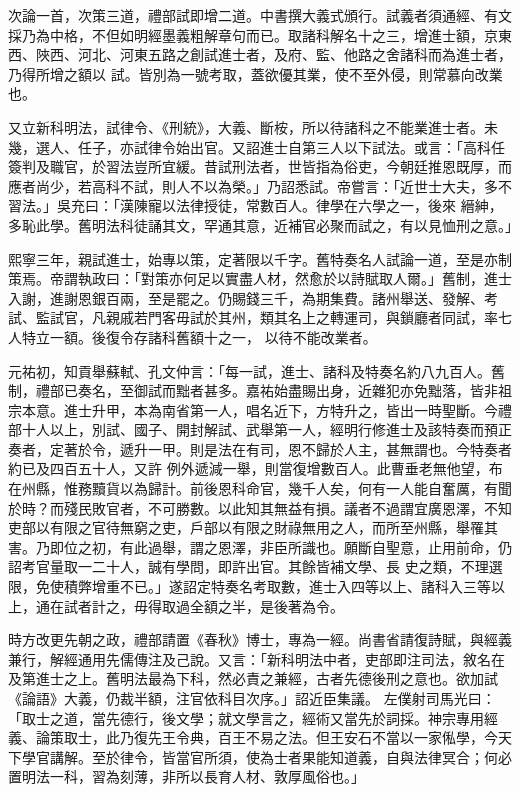 \begin{pinyinscope}
 次論一首，次策三道，禮部試即增二道。中書撰大義式頒行。試義者須通經、有文採乃為中格，不但如明經墨義粗解章句而已。取諸科解名十之三，增進士額，京東西、陜西、河北、河東五路之創試進士者，及府、監、他路之舍諸科而為進士者，乃得所增之額以
 試。皆別為一號考取，蓋欲優其業，使不至外侵，則常慕向改業也。



 又立新科明法，試律令、《刑統》，大義、斷桉，所以待諸科之不能業進士者。未幾，選人、任子，亦試律令始出官。又詔進士自第三人以下試法。或言：「高科任簽判及職官，於習法豈所宜緩。昔試刑法者，世皆指為俗吏，今朝廷推恩既厚，而應者尚少，若高科不試，則人不以為榮。」乃詔悉試。帝嘗言：「近世士大夫，多不習法。」吳充曰：「漢陳寵以法律授徒，常數百人。律學在六學之一，後來
 縉紳，多恥此學。舊明法科徒誦其文，罕通其意，近補官必聚而試之，有以見恤刑之意。」



 熙寧三年，親試進士，始專以策，定著限以千字。舊特奏名人試論一道，至是亦制策焉。帝謂執政曰：「對策亦何足以實盡人材，然愈於以詩賦取人爾。」舊制，進士入謝，進謝恩銀百兩，至是罷之。仍賜錢三千，為期集費。諸州舉送、發解、考試、監試官，凡親戚若門客毋試於其州，類其名上之轉運司，與鎖廳者同試，率七人特立一額。後復令存諸科舊額十之一，
 以待不能改業者。



 元祐初，知貢舉蘇軾、孔文仲言：「每一試，進士、諸科及特奏名約八九百人。舊制，禮部已奏名，至御試而黜者甚多。嘉祐始盡賜出身，近雜犯亦免黜落，皆非祖宗本意。進士升甲，本為南省第一人，唱名近下，方特升之，皆出一時聖斷。今禮部十人以上，別試、國子、開封解試、武舉第一人，經明行修進士及該特奏而預正奏者，定著於令，遞升一甲。則是法在有司，恩不歸於人主，甚無謂也。今特奏者約已及四百五十人，又許
 例外遞減一舉，則當復增數百人。此曹垂老無他望，布在州縣，惟務黷貨以為歸計。前後恩科命官，幾千人矣，何有一人能自奮厲，有聞於時？而殘民敗官者，不可勝數。以此知其無益有損。議者不過謂宜廣恩澤，不知吏部以有限之官待無窮之吏，戶部以有限之財祿無用之人，而所至州縣，舉罹其害。乃即位之初，有此過舉，謂之恩澤，非臣所識也。願斷自聖意，止用前命，仍詔考官量取一二十人，誠有學問，即許出官。其餘皆補文學、長
 史之類，不理選限，免使積弊增重不已。」遂詔定特奏名考取數，進士入四等以上、諸科入三等以上，通在試者計之，毋得取過全額之半，是後著為令。



 時方改更先朝之政，禮部請置《春秋》博士，專為一經。尚書省請復詩賦，與經義兼行，解經通用先儒傳注及己說。又言：「新科明法中者，吏部即注司法，敘名在及第進士之上。舊明法最為下科，然必責之兼經，古者先德後刑之意也。欲加試《論語》大義，仍裁半額，注官依科目次序。」詔近臣集議。
 左僕射司馬光曰：「取士之道，當先德行，後文學；就文學言之，經術又當先於詞採。神宗專用經義、論策取士，此乃復先王令典，百王不易之法。但王安石不當以一家俬學，今天下學官講解。至於律令，皆當官所須，使為士者果能知道義，自與法律冥合；何必置明法一科，習為刻薄，非所以長育人材、敦厚風俗也。」




\end{pinyinscope}
